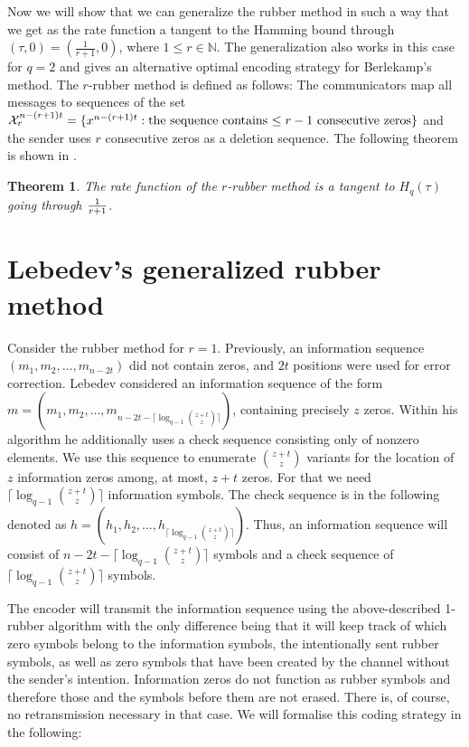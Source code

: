 \documentclass[conference]{IEEEtran}
\newtheorem{Theorem}{Theorem}
\def\NN{{\mathbb N}}
\begin{document}
\bigskip
Now we will show that we can generalize the rubber method in such a way that we get as the rate function a tangent
to the Hamming bound through $(\tau,0)=({\frac 1{r+1}},0)$, where $1\leq r\in\NN$. 
The generalization also works in this case for $q=2$ and gives an alternative optimal encoding strategy for Berlekamp's method.
The $r$-rubber method is defined as follows: The communicators map all messages to sequences of the set
${\cal X}_r^{n-(r+1)t}=\{ x^{n-(r+1)t} : \mbox{the sequence contains $\leq r-1$ consecutive zeros}\}$
and the sender uses $r$ consecutive zeros as a deletion sequence.
The following theorem is shown in \cite{ADL05}.
\begin{Theorem}

The rate function of the $r$-rubber method is a tangent to $H_q(\tau)$ going through ${1\over r+1}$.
\end{Theorem}
\section{Lebedev's generalized rubber method}

Consider the rubber method for $r= 1$. Previously, an information sequence $(m_1,m_2,\dots,m_{n-2t})$ did not contain zeros, and $2t$ positions were used for error correction. Lebedev \cite{L16} considered an information sequence of the form
$m=(m_1,m_2,\ldots ,m_{n-2t-\lceil \log_{q-1}\binom{z+t}{z}
\rceil})$, containing precisely $z$ zeros. Within his algorithm he additionally uses a check sequence consisting only of nonzero elements. We use this sequence to enumerate $\binom{z+t}{z}$ variants for the location of 
$z$ information zeros among, at most, $z+t$ zeros. For that we need $\lceil
\log_{q-1}\binom{z+t}{z} \rceil $ information symbols.
The check sequence is in the following denoted as $h=(h_1,h_2,\ldots ,h_{\lceil
\log_{q-1}\binom{z+t}{z} \rceil})$. 
Thus, an information sequence will consist of $n-2t-\lceil \log_{q-1}\binom{z+t}{z} \rceil $ symbols and a check sequence of $\lceil \log_{q-1}\binom{z+t}{z} \rceil $ symbols.

The encoder will transmit the information sequence using the above-described 1-rubber algorithm with the only difference being 
that it will keep track of which zero symbols belong to the information symbols, the intentionally sent rubber symbols, as well as zero symbols that have been created by the channel without the sender's intention. Information zeros do not function as rubber symbols and therefore those and the symbols before them are not erased. There is, of course, no retransmission necessary in that case. We will formalise this coding strategy in the following:
\end{document}
